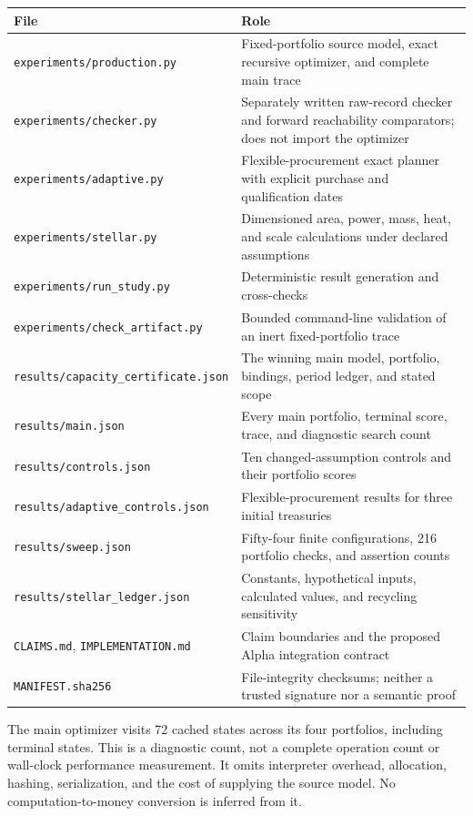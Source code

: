 \documentclass[11pt,letterpaper]{article}
\newcommand{\1}{\mathbf 1}
\theoremstyle{remark}\newtheorem{remark}{Remark}[section]
\begin{document}
\begin{table}[htbp]\centering\small
\begin{tabularx}{\linewidth}{@{}P{.41\linewidth}Y@{}}\toprule
File & Role\\\midrule
\texttt{experiments/production.py} & Fixed-portfolio source model, exact recursive optimizer, and complete main trace\\
\texttt{experiments/checker.py} & Separately written raw-record checker and forward reachability comparators; does not import the optimizer\\
\texttt{experiments/adaptive.py} & Flexible-procurement exact planner with explicit purchase and qualification dates\\
\texttt{experiments/stellar.py} & Dimensioned area, power, mass, heat, and scale calculations under declared assumptions\\
\texttt{experiments/run\_study.py} & Deterministic result generation and cross-checks\\
\texttt{experiments/check\_artifact.py} & Bounded command-line validation of an inert fixed-portfolio trace\\
\texttt{results/capacity\_certificate.json} & The winning main model, portfolio, bindings, period ledger, and stated scope\\
\texttt{results/main.json} & Every main portfolio, terminal score, trace, and diagnostic search count\\
\texttt{results/controls.json} & Ten changed-assumption controls and their portfolio scores\\
\texttt{results/adaptive\_controls.json} & Flexible-procurement results for three initial treasuries\\
\texttt{results/sweep.json} & Fifty-four finite configurations, 216 portfolio checks, and assertion counts\\
\texttt{results/stellar\_ledger.json} & Constants, hypothetical inputs, calculated values, and recycling sensitivity\\
\texttt{CLAIMS.md}, \texttt{IMPLEMENTATION.md} & Claim boundaries and the proposed Alpha integration contract\\
\texttt{MANIFEST.sha256} & File-integrity checksums; neither a trusted signature nor a semantic proof\\\bottomrule
\end{tabularx}
\end{table}

The main optimizer visits 72 cached states across its four portfolios, including terminal states. This is a diagnostic count, not a complete operation count or wall-clock performance measurement. It omits interpreter overhead, allocation, hashing, serialization, and the cost of supplying the source model. No computation-to-money conversion is inferred from it.
\end{document}
